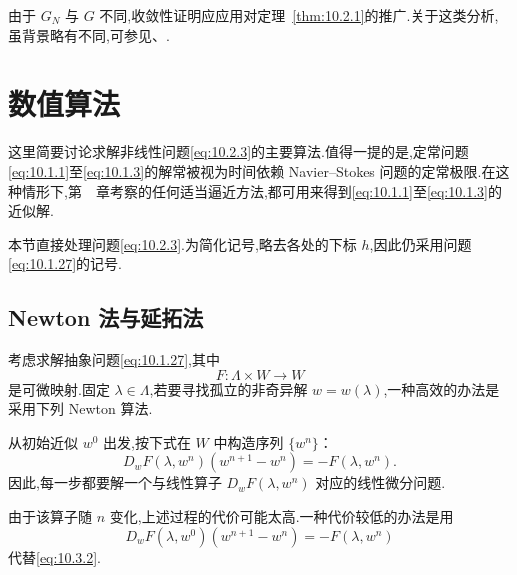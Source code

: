 由于 \(G_N\) 与 \(G\) 不同,收敛性证明应应用对定理~\ref{thm:10.2.1}的推广.关于这类分析,虽背景略有不同,可参见、.

\section{数值算法}\label{sec:10.3}

这里简要讨论求解非线性问题\eqref{eq:10.2.3}的主要算法.值得一提的是,定常问题\eqref{eq:10.1.1}至\eqref{eq:10.1.3}的解常被视为时间依赖 Navier--Stokes 问题的定常极限.在这种情形下,第~~章考察的任何适当逼近方法,都可用来得到\eqref{eq:10.1.1}至\eqref{eq:10.1.3}的近似解.

本节直接处理问题\eqref{eq:10.2.3}.为简化记号,略去各处的下标 \(h\),因此仍采用问题\eqref{eq:10.1.27}的记号.

\subsection{Newton 法与延拓法}\label{sec:10.3.1}

考虑求解抽象问题\eqref{eq:10.1.27},其中
\begin{equation}\label{eq:10.3.1}
  F\colon\Lambda\times W\to W
\end{equation}
是可微映射.固定 \(\lambda\in\Lambda\),若要寻找孤立的非奇异解 \(w=w(\lambda)\),一种高效的办法是采用下列 Newton 算法.

从初始近似 \(w^0\) 出发,按下式在 \(W\) 中构造序列 \(\{w^n\}\)：
\begin{equation}\label{eq:10.3.2}
  D_wF(\lambda,w^n)(w^{n+1}-w^n)=-F(\lambda,w^n).
\end{equation}
因此,每一步都要解一个与线性算子 \(D_wF(\lambda,w^n)\) 对应的线性微分问题.

由于该算子随 \(n\) 变化,上述过程的代价可能太高.一种代价较低的办法是用
\begin{equation}\label{eq:10.3.3}
  D_wF(\lambda,w^0)(w^{n+1}-w^n)=-F(\lambda,w^n)
\end{equation}
代替\eqref{eq:10.3.2}.

